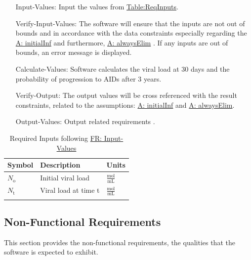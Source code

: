 \documentclass[12pt]{article}
\begin{document}
\begin{itemize}
\item[Input-Values:\phantomsection\label{inputValues}]{Input the values from \hyperref[Table:ReqInputs]{Table:ReqInputs}.}
\item[Verify-Input-Values:\phantomsection\label{verifyInput}]{The software will ensure that the inputs are not   out of bounds and in accordance with the data constraints especially regarding the \hyperref[initialInf]{A: initialInf} and furthermore, \hyperref[alwaysElim]{A: alwaysElim} . If any inputs are out of bounds, an error message is displayed.}
\item[Calculate-Values:\phantomsection\label{calcValues}]{Software calculates the viral load at 30 days and  the probability of progression to AIDs after 3 years.}
\item[Verify-Output:\phantomsection\label{verifyOutput}]{The output values will be cross referenced with  the result constraints, related to the assumptions: \hyperref[initialInf]{A: initialInf} and \hyperref[alwaysElim]{A: alwaysElim}.}
\item[Output-Values:\phantomsection\label{outputValues}]{Output related requirements .}
\end{itemize}
\begin{longtable}{l l l}
\toprule
\textbf{Symbol} & \textbf{Description} & \textbf{Units}
\\
\midrule
\endhead
${N_{\text{o}}}$ & Initial viral load & $\frac{\text{mol}}{\text{mL}}$
\\
${N_{\text{t}}}$ & Viral load at time t & $\frac{\text{mol}}{\text{mL}}$
\\
\bottomrule
\caption{Required Inputs following \hyperref[inputValues]{FR: Input-Values}}
\label{Table:ReqInputs}
\end{longtable}
\subsection{Non-Functional Requirements}
\label{Sec:NFRs}
This section provides the non-functional requirements, the qualities that the software is expected to exhibit.
\end{document}
